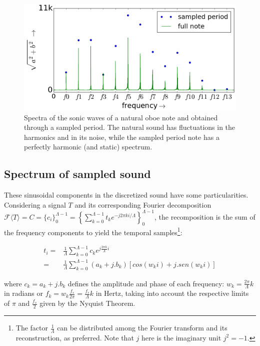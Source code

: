 \begin{figure}
    \centering
        \includegraphics[width=.7\textwidth]{figures/oboeNaturalSampledSpectrum_}
	\caption{Spectra of the sonic waves of a natural oboe note and obtained through a sampled period. The natural sound has fluctuations in the harmonics and in its noise, while the sampled period note has a perfectly harmonic (and static) spectrum.}
        \label{fig:espectroOboe}
\end{figure}


\subsection{Spectrum of sampled sound}
These sinusoidal components in the discretized sound have some particularities. Considering a signal $T$ and its corresponding Fourier decomposition $\mathcal{F}\langle T\rangle=C=\{c_i\}_0^{\Lambda-1}=\left\{ \sum_{k=0}^{\Lambda-1}t_ke^{-j2\pi ki/\Lambda} \right\}_0^{\Lambda-1}$, the recomposition is the sum of the frequency components to yield the temporal samples\footnote{The factor $\frac{1}{\Lambda}$ can be distributed among the Fourier transform and its reconstruction, as preferred. Note that $j$ here is the imaginary unit $j^2=-1$.}:

\begin{equation}\label{recomposicaoFourier}
\begin{split}
t_i = & \frac{1}{\Lambda}\sum_{k=0}^{\Lambda-1}c_ke^{j \frac{2\pi k}{\Lambda} i } \\ 
    = & \frac{1}{\Lambda}\sum_{k=0}^{\Lambda-1}(a_k+ j . b_k)\left[cos(w_k i)   +j . sen(w_k i)\right]
\end{split}
\end{equation}

\noindent where $c_k = a_k + j . b_k$ defines the amplitude and phase of each frequency: $w_k=\frac{2\pi}{\Lambda}k$ in radians or $f_k=w_k\frac{f_s}{2\pi}=\frac{f_s}{\Lambda}k$ in Hertz, taking into account the respective limits of $\pi$ and $\frac{f_s}{2}$ given by the Nyquist Theorem.

